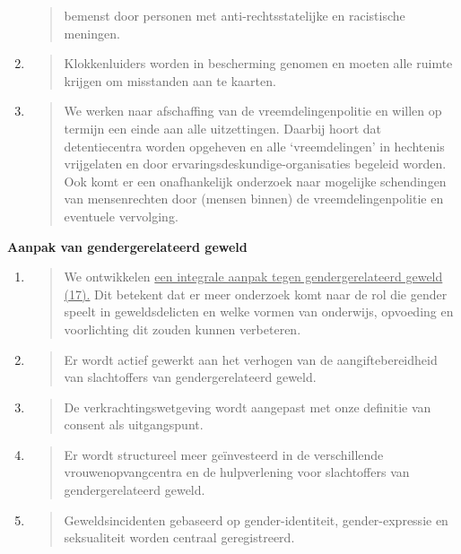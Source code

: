 \begin{enumerate}
\begin{quote}
  bemenst door personen met anti-rechtsstatelijke en racistische
  meningen.
  \end{quote}
\item
  \begin{quote}
  Klokkenluiders worden in bescherming genomen en moeten alle ruimte
  krijgen om misstanden aan te kaarten.
  \end{quote}
\item
  \begin{quote}
  We werken naar afschaffing van de vreemdelingenpolitie en willen op
  termijn een einde aan alle uitzettingen. Daarbij hoort dat
  detentiecentra worden opgeheven en alle `vreemdelingen' in hechtenis
  vrijgelaten en door ervaringsdeskundige-organisaties begeleid worden.
  Ook komt er een onafhankelijk onderzoek naar mogelijke schendingen van
  mensenrechten door (mensen binnen) de vreemdelingenpolitie en
  eventuele vervolging.
  \end{quote}
\end{enumerate}

\textbf{Aanpak van gendergerelateerd geweld}

\begin{enumerate}
\def\labelenumi{\arabic{enumi}.}
\item
  \begin{quote}
  We ontwikkelen \underline{een integrale aanpak tegen gendergerelateerd
  geweld (17).} Dit betekent dat er meer onderzoek komt naar de rol die
  gender speelt in geweldsdelicten en welke vormen van onderwijs,
  opvoeding en voorlichting dit zouden kunnen verbeteren.
  \end{quote}
\item
  \begin{quote}
  Er wordt actief gewerkt aan het verhogen van de aangiftebereidheid van
  slachtoffers van gendergerelateerd geweld.
  \end{quote}
\item
  \begin{quote}
  De verkrachtingswetgeving wordt aangepast met onze definitie van
  consent als uitgangspunt.
  \end{quote}
\item
  \begin{quote}
  Er wordt structureel meer geïnvesteerd in de verschillende
  vrouwenopvangcentra en de hulpverlening voor slachtoffers van
  gendergerelateerd geweld.
  \end{quote}
\item
  \begin{quote}
  Geweldsincidenten gebaseerd op gender-identiteit, gender-expressie en
  seksualiteit worden centraal geregistreerd.
  \end{quote}
\end{enumerate}

